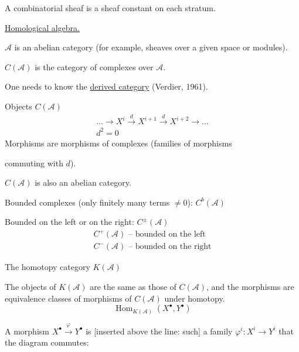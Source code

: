 A combinatorial sheaf is a sheaf constant on each stratum.

\underline{Homological algebra.}

$\mathcal A$ is an abelian category (for example, sheaves over a given space or modules).

$C(\mathcal A)$ is the category of complexes over $\mathcal A$.

One needs to know the \underline{derived category} (Verdier, 1961).

Objects 
$C(\mathcal A)$
\begin{gather*}
\ldots\longrightarrow X^i\overset{d}{\longrightarrow}X^{i+1}
\overset{d}{\longrightarrow}X^{i+2}\longrightarrow\ldots\\
d^2=0
\end{gather*}
Morphisms are morphisms of complexes (families of morphisms
 commuting with $d$).

$C(\mathcal A)$ is also an abelian category.

Bounded complexes (only finitely many terms $\neq0$): $C^b(\mathcal A)$

Bounded on the left or on the right: $C^{\pm}(\mathcal A)$
\begin{gather*}
C^+(\mathcal A)\text{ -- bounded on the left}\\
C^-(\mathcal A)\text{ -- bounded on the right}
\end{gather*}

The homotopy category $K(\mathcal A)$

The objects of $K(\mathcal A)$ are the same as those of $C(\mathcal A)$, and the morphisms are equivalence classes
of morphisms of $C(\mathcal A)$ under homotopy.
\begin{equation*}
\operatorname{Hom}_{K(\mathcal A)}(X^\bullet,Y^\bullet)
\end{equation*}

A morphism $X^\bullet\overset{\varphi}{\longrightarrow}Y^\bullet$ is [inserted above the line: such]
a family $\varphi^i\colon X^i\longrightarrow Y^i$ that the diagram commutes:

